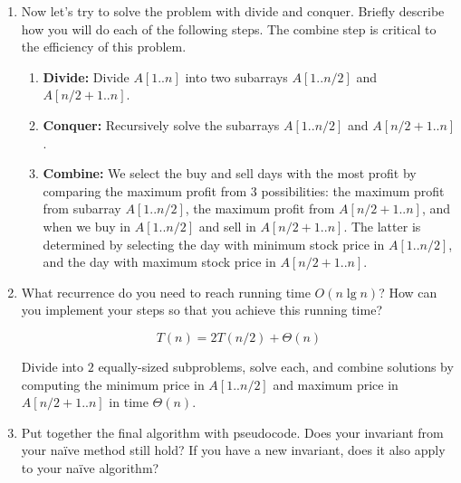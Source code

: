\documentclass[letterpaper,11pt]{article}
\begin{document}
\begin{enumerate}
\begin{enumerate}
\item Now let's try to solve the problem with divide and conquer. Briefly describe how you will do each of the following steps. The combine step is critical to the efficiency of this problem.
\begin{enumerate}
\item {\bf Divide:} Divide $A[1..n]$ into two subarrays $A[1..n/2]$ and $A[n/2+1..n]$.
\vspace*{0.7cm}
\item {\bf Conquer:} Recursively solve the subarrays $A[1..n/2]$ and $A[n/2+1..n]$.
\vspace*{0.7cm}
\item {\bf Combine:} We select the buy and sell days with the most profit by comparing the maximum profit from 3 possibilities: the maximum profit from subarray $A[1..n/2]$, the maximum profit from $A[n/2+1..n]$, and when we buy in $A[1..n/2]$ and sell in $A[n/2+1..n]$. The latter is determined by selecting the day with minimum stock price in $A[1..n/2]$, and the day with maximum stock price in $A[n/2+1..n]$.
\vspace*{0.7cm}
\end{enumerate}
\item What recurrence do you need to reach running time $O(n\lg n)$? How can you implement your steps so that you achieve this running time?

\[T(n) = 2T(n/2) + \Theta(n)\]

Divide into $2$ equally-sized subproblems, solve each, and combine solutions by computing the minimum price in $A[1..n/2]$ and maximum price in $A[n/2+1..n]$ in time $\Theta(n)$.

\newpage
\item Put together the final algorithm with pseudocode. Does your invariant from your na\"ive method still hold? If you have a new invariant, does it also apply to your na\"ive algorithm?\\


\end{enumerate}
\end{enumerate}
\end{document}
